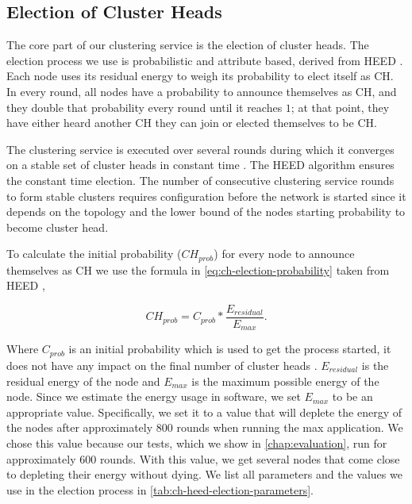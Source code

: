 \subsection{Election of Cluster Heads}
The core part of our clustering service is the election of cluster heads. The election process we use is probabilistic and attribute based, derived from HEED \cite{Younis2004-HEED}. Each node uses its residual energy to weigh its probability to elect itself as CH. In every round, all nodes have a probability to announce themselves as CH, and they double that probability every round until it reaches $1$; at that point, they have either heard another CH they can join or elected themselves to be CH.

The clustering service is executed over several rounds during which it converges on a stable set of cluster heads in constant time \cite{Younis2004-HEED}. The HEED algorithm ensures the constant time election. The number of consecutive clustering service rounds to form stable clusters requires configuration before the network is started since it depends on the topology and the lower bound of the nodes starting probability to become cluster head.

To calculate the initial probability ($CH_{prob}$) for every node to announce themselves as CH we use the formula in \cref{eq:ch-election-probability} taken from HEED \cite{Younis2004-HEED},

\begin{equation}
    CH_{prob} = C_{prob} * \frac{E_{residual}}{E_{max}}.
    \label{eq:ch-election-probability}
\end{equation}

Where $C_{prob}$ is an initial probability which is used to get the process started, it does not have any impact on the final number of cluster heads \cite{Younis2004-HEED}. $E_{residual}$ is the residual energy of the node and $E_{max}$ is the maximum possible energy of the node. Since we estimate the energy usage in software, we set $E_{max}$ to be an appropriate value. Specifically, we set it to a value that will deplete the energy of the nodes after approximately 800 \atwo{} rounds when running the max application. We chose this value because our tests, which we show in \cref{chap:evaluation}, run for approximately 600 rounds. With this value, we get several nodes that come close to depleting their energy without dying. We list all parameters and the values we use in the election process in \cref{tab:ch-heed-election-parameters}.

